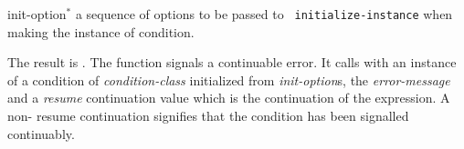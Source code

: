 \begin{optDefinition}
\begin{arguments}
    \item[init-option\/$^*$] a sequence of options to be passed to {\tt
        initialize-instance} when making the instance of condition.
\end{arguments}
%
\result%
The result is \nil{}.
%
\remarks%
The  function signals a continuable error.  It calls
 with an instance of a condition of {\em condition-class}
initialized from {\em init-option}\/s, the {\em error-message} and a {\em
    resume} continuation value which is the continuation of the
 expression.  A non-\nil{}\/ resume continuation signifies
that the condition has been signalled continuably.
%
\end{optDefinition}
